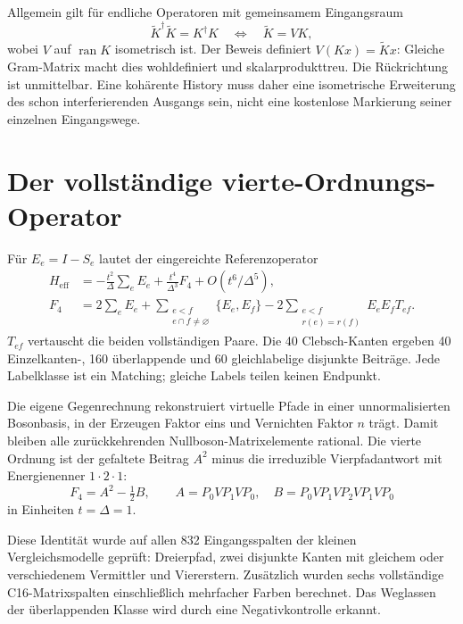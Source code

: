 Allgemein gilt für endliche Operatoren mit gemeinsamem Eingangsraum
\begin{equation}
\widetilde K^\dagger\widetilde K=K^\dagger K
\quad\Longleftrightarrow\quad
\widetilde K=VK,
\end{equation}
wobei $V$ auf $\operatorname{ran}K$ isometrisch ist. Der Beweis definiert $V(Kx)=\widetilde Kx$: Gleiche Gram-Matrix macht dies wohldefiniert und skalarprodukttreu. Die Rückrichtung ist unmittelbar. Eine kohärente History muss daher eine isometrische Erweiterung des schon interferierenden Ausgangs sein, nicht eine kostenlose Markierung seiner einzelnen Eingangswege.

\section{Der vollständige vierte-Ordnungs-Operator}
Für $E_e=I-S_e$ lautet der eingereichte Referenzoperator
\begin{align}
H_{\mathrm{eff}}&=-\frac{t^2}{\Delta}\sum_eE_e
+\frac{t^4}{\Delta^3}F_4+O(t^6/\Delta^5),\\
F_4&=2\sum_eE_e+
\sum_{\substack{e<f\\e\cap f\ne\varnothing}}\{E_e,E_f\}
-2\sum_{\substack{e<f\\r(e)=r(f)}}E_eE_fT_{ef}.
\end{align}
$T_{ef}$ vertauscht die beiden vollständigen Paare. Die 40 Clebsch-Kanten ergeben 40 Einzelkanten-, 160 überlappende und 60 gleichlabelige disjunkte Beiträge. Jede Labelklasse ist ein Matching; gleiche Labels teilen keinen Endpunkt.

Die eigene Gegenrechnung rekonstruiert virtuelle Pfade in einer unnormalisierten Bosonbasis, in der Erzeugen Faktor eins und Vernichten Faktor $n$ trägt. Damit bleiben alle zurückkehrenden Nullboson-Matrixelemente rational. Die vierte Ordnung ist der gefaltete Beitrag $A^2$ minus die irreduzible Vierpfadantwort mit Energienenner $1\cdot2\cdot1$:
\begin{equation}
F_4=A^2-\tfrac12 B,\qquad
A=P_0VP_1VP_0,\quad B=P_0VP_1VP_2VP_1VP_0
\end{equation}
in Einheiten $t=\Delta=1$.

Diese Identität wurde auf allen 832 Eingangsspalten der kleinen Vergleichsmodelle geprüft: Dreierpfad, zwei disjunkte Kanten mit gleichem oder verschiedenem Vermittler und Viererstern. Zusätzlich wurden sechs vollständige C16-Matrixspalten einschließlich mehrfacher Farben berechnet. Das Weglassen der überlappenden Klasse wird durch eine Negativkontrolle erkannt.

